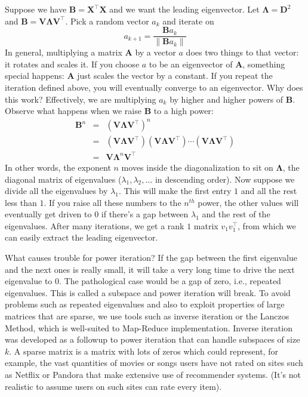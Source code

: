 \documentclass[a4paper]{article}
\begin{document}
Suppose we have $\mathbf{B} = \mathbf{X}^\top \mathbf{X}$ and we want the leading eigenvector. Let $\mathbf{\Lambda} = \mathbf{D}^2$ and $\mathbf{B} = \mathbf{V} \mathbf{\Lambda} \mathbf{V}^\top$. Pick a random vector $a_k$ and iterate on
$$
a_{k+1} = \frac{\mathbf{B} {a_k}}{\|\mathbf{B} {a_k}\|}
$$
In general, multiplying a matrix $\mathbf{A}$ by a vector $a$ does two things to that vector: it rotates and scales it.  If you choose $a$ to be an eigenvector of $\mathbf{A}$, something special happens: $\mathbf{A}$ just scales the vector by a constant. If you repeat the iteration defined above, you will eventually converge to an eigenvector.  Why does this work?  Effectively, we are multiplying $a_k$ by higher and higher powers of $\mathbf{B}$.  Observe what happens when we raise $\mathbf{B}$ to a high power:
\begin{eqnarray*}
\mathbf{B}^n &=& (\mathbf{V} \mathbf{\Lambda} \mathbf{V}^\top)^n \\
&=& (\mathbf{V} \mathbf{\Lambda} \mathbf{V}^\top)(\mathbf{V} \mathbf{\Lambda} \mathbf{V}^\top)\cdots(\mathbf{V} \mathbf{\Lambda} \mathbf{V}^\top) \\
&=& \mathbf{V} \mathbf{\Lambda}^n \mathbf{V}^\top
\end{eqnarray*}
In other words, the exponent $n$ moves inside the diagonalization to sit on $\mathbf{\Lambda}$, the diagonal matrix of eigenvalues ($\lambda_1, \lambda_2, \ldots$ in descending order).  Now suppose we divide all the eigenvalues by $\lambda_1$.  This will make the first entry $1$ and all the rest less than $1$.  If you raise all these numbers to the $n^{th}$ power, the other values will eventually get driven to $0$ if there's a gap between $\lambda_1$ and the rest of the eigenvalues.  After many iterations, we get a rank $1$ matrix $v_1 v_1^\top$, from which we can easily extract the leading eigenvector.

What causes trouble for power iteration?
If the gap between the first eigenvalue and the next ones is really small, it will take a very long time to drive the next eigenvalue to 0.  The pathological case would be a gap of zero, i.e., repeated eigenvalues.  This is called a subspace and power iteration will break.  To avoid problems such as repeated eigenvalues and also to exploit properties of large matrices that are sparse, we use tools such as inverse iteration or the Lanczos Method, which is well-suited to Map-Reduce implementation.  Inverse iteration was developed as a followup to power iteration that can handle subspaces of size $k$.  A sparse matrix is a matrix with lots of zeros which could represent, for example, the vast quantities of movies or songs users have not rated on sites such as Netflix or Pandora that make extensive use of recommender systems.  (It's not realistic to assume users on such sites can rate every item).
\end{document}
